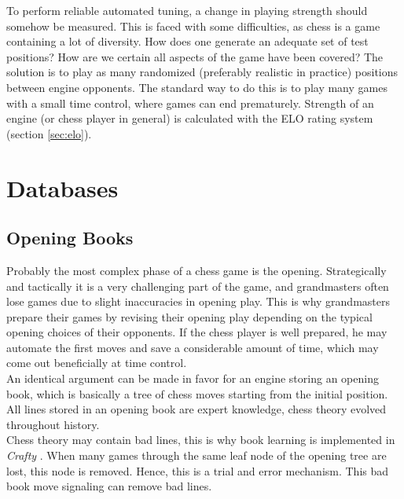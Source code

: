 To perform reliable automated tuning, a change in playing strength should somehow be measured. This is faced with some difficulties, as chess is a game containing a lot of diversity. How does one generate an adequate set of test positions? How are we certain all aspects of the game have been covered? The solution is to play as many randomized (preferably realistic in practice) positions between engine opponents. The standard way to do this is to play many games with a small time control, where games can end prematurely. Strength of an engine (or chess player in general) is calculated with the ELO rating system (section \ref{sec:elo}).

\section{Databases}
\label{sec:databases}

\subsection{Opening Books}
\label{subsec:opening_books}
Probably the most complex phase of a chess game is the opening. Strategically and tactically it is a very challenging part of the game, and grandmasters often lose games due to slight inaccuracies in opening play. This is why grandmasters prepare their games by revising their opening play depending on the typical opening choices of their opponents. If the chess player is well prepared, he may automate the first moves and save a considerable amount of time, which may come out beneficially at time control. \\
An identical argument can be made in favor for an engine storing an opening book, which is basically a tree of chess moves starting from the initial position. All lines stored in an opening book are expert knowledge, chess theory evolved throughout history. \\

Chess theory may contain bad lines, this is why book learning is implemented in \textit{Crafty} \cite{hyatt1999,Kloetzer2011}. When many games through the same leaf node of the opening tree are lost, this node is removed. Hence, this is a trial and error mechanism. This bad book move signaling can remove bad lines.


